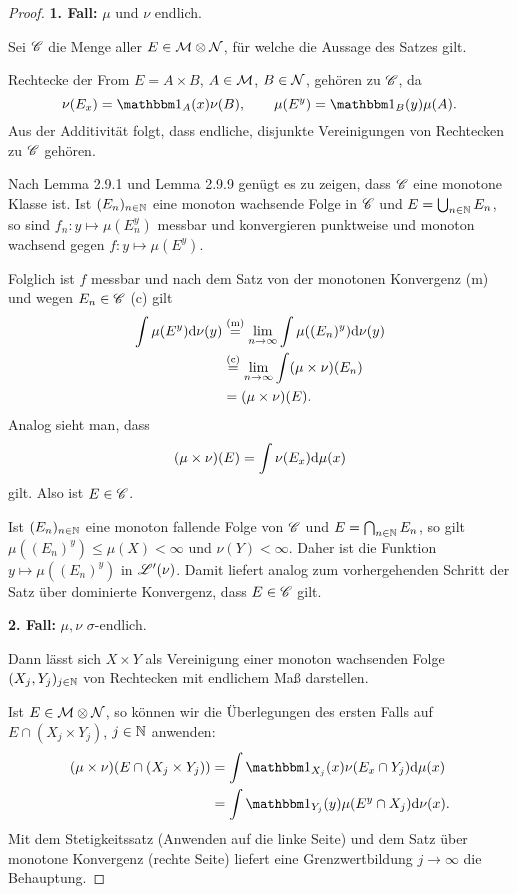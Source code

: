 \begin{proof}
 \textbf{1. Fall:} $\mu$ und $\nu$ endlich. 
 
 Sei $\mathscr{C}$ die Menge aller $E \in \mathcal{M} \otimes \mathcal{N}$, für welche die Aussage des Satzes gilt.
 
 Rechtecke der From $E= A \times B$, $A \in \mathcal{M}$, $B \in \mathcal{N}$, gehören zu $\mathscr{C}$, da
 \[ \nu(E_x) = \ind_A (x) \nu(B), \qquad \mu(E^y) = \ind_B (y) \mu(A). \]
 Aus der Additivität folgt, dass endliche, disjunkte Vereinigungen von Rechtecken zu $\mathscr{C}$ gehören.
 
 Nach Lemma 2.9.1 und Lemma 2.9.9 genügt es zu zeigen, dass $\mathscr{C}$ eine monotone Klasse ist. Ist $(E_n)_{n \in \mathbb{N}}$ eine monoton wachsende Folge in $\mathscr{C}$ und $E = \bigcup_{n \in \mathbb{N}} E_n$, so sind $f_n: y \mapsto \mu(E_n^y)$ messbar und konvergieren punktweise und monoton wachsend gegen $f: y \mapsto \mu(E^y)$.
 
 Folglich ist $f$ messbar und nach dem Satz von der monotonen Konvergenz (m) und wegen $E_n \in \mathscr{C}$ (c) gilt
 \[ \begin{aligned}
     \int \mu(E^y) \mathrm{d} \nu(y) 
     &\overset{(\text{m})}{=} \lim_{n \to \infty} \int \mu((E_n)^y) \mathrm{d} \nu(y) \\
     &\overset{(\text{c})}{=} \lim_{n \to \infty} \int (\mu \times \nu)(E_n) \\
     &= (\mu \times \nu)(E).
    \end{aligned} \]
 Analog sieht man, dass
 \[ (\mu \times \nu)(E) = \int \nu(E_x) \mathrm{d} \mu(x) \]
 gilt. Also ist $E \in \mathscr{C}$.
 
 Ist $(E_n)_{n \in \mathbb{N}}$ eine monoton fallende Folge von $\mathscr{C}$ und $E = \bigcap_{n \in \mathbb{N}} E_n$, so gilt $\mu((E_n)^y) \le \mu(X) < \infty$ und $\nu(Y) < \infty$. Daher ist die Funktion $y \mapsto \mu((E_n)^y)$ in $\mathscr{L}'(\nu)$. Damit liefert analog zum vorhergehenden Schritt der Satz über dominierte Konvergenz, dass $E \in  \mathscr{C}$ gilt.
 
 \textbf{2. Fall:} $\mu, \nu$ $\sigma$-endlich.
 
 Dann lässt sich $X \times Y$ als Vereinigung einer monoton wachsenden Folge $(X_j,Y_j)_{j \in \mathbb{N}}$ von Rechtecken mit endlichem Maß darstellen.
 
 Ist $E \in \mathcal{M} \otimes \mathcal{N}$, so können wir die Überlegungen des ersten Falls auf $E \cap (X_j \times Y_j)$, $j \in \mathbb{N}$ anwenden:
 \[ \begin{aligned}
     (\mu \times \nu)(E \cap (X_j \times Y_j)) 
     &= \int \ind_{X_j}(x) \nu( E_x \cap Y_j ) \diffop \mu(x) \\
     &= \int \ind_{Y_j}(y) \mu( E^y \cap X_j ) \diffop \nu(x).
    \end{aligned} \]
 Mit dem Stetigkeitssatz (Anwenden auf die linke Seite) und dem Satz über monotone Konvergenz (rechte Seite) liefert eine Grenzwertbildung $j \to \infty$ die Behauptung.
\end{proof}

